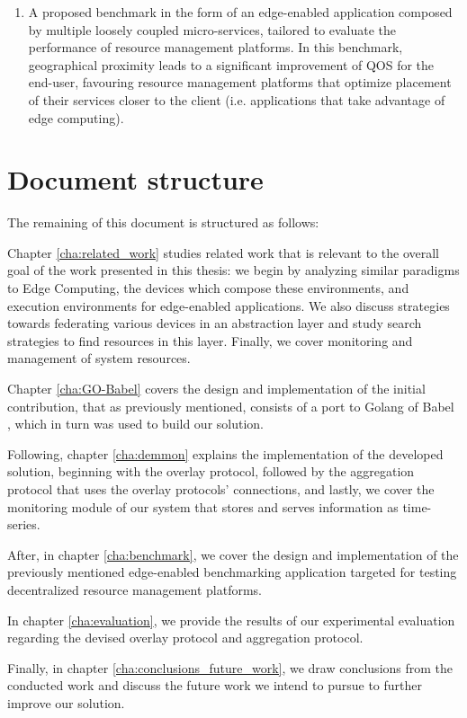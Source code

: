 \begin{enumerate}
{\begin{enumerate}
        \end{enumerate}
        }
    \item A proposed benchmark in the form of an edge-enabled application composed by multiple loosely coupled micro-services, tailored to evaluate the performance of resource management platforms. In this benchmark, geographical proximity leads to a significant improvement of QOS for the end-user, favouring resource management platforms that optimize placement of their services closer to the client (i.e. applications that take advantage of edge computing).
    
\end{enumerate}

\section{Document structure}

The remaining of this document is structured as follows: 

Chapter \ref{cha:related_work} studies related work that is relevant to the overall goal of the work presented in this thesis: we begin by analyzing similar paradigms to Edge Computing, the devices which compose these environments, and execution environments for edge-enabled applications. We also discuss strategies towards federating various devices in an abstraction layer and study search strategies to find resources in this layer. Finally, we cover monitoring and management of system resources.

Chapter \ref{cha:GO-Babel} covers the design and implementation of the initial contribution, that as previously mentioned, consists of a port to Golang of Babel \cite{babel}, which in turn was used to build our solution. 

Following, chapter \ref{cha:demmon} explains the implementation of the developed solution, beginning with the overlay protocol, followed by the aggregation protocol that uses the overlay protocols' connections, and lastly, we cover the monitoring module of our system that stores and serves information as time-series.

After, in chapter \ref{cha:benchmark}, we cover the design and implementation of the previously mentioned edge-enabled benchmarking application targeted for testing decentralized resource management platforms.

In chapter \ref{cha:evaluation}, we provide the results of our experimental evaluation regarding the devised overlay protocol and aggregation protocol.

Finally, in chapter \ref{cha:conclusions_future_work}, we draw conclusions from the conducted work and discuss the future work we intend to pursue to further improve our solution.